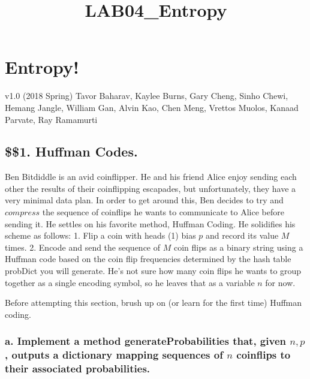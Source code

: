 \documentclass[11pt]{article}
\title{LAB04\_Entropy}
\begin{document}
    
    
    \maketitle
    
    

    
    \section{Entropy!}\label{entropy}

v1.0 (2018 Spring) Tavor Baharav, Kaylee Burns, Gary Cheng, Sinho Chewi,
Hemang Jangle, William Gan, Alvin Kao, Chen Meng, Vrettos Muolos, Kanaad
Parvate, Ray Ramamurti

    \subsection{\texorpdfstring{\$\$1. Huffman
Codes.}{\$\$1. Huffman Codes.}}\label{huffman-codes.}

    Ben Bitdiddle is an avid coinflipper. He and his friend Alice enjoy
sending each other the results of their coinflipping escapades, but
unfortunately, they have a very minimal data plan. In order to get
around this, Ben decides to try and \(\textit{compress}\) the sequence
of coinflips he wants to communicate to Alice before sending it. He
settles on his favorite method, Huffman Coding. He solidifies his scheme
as follows: 1. Flip a coin with heads (1) bias \(p\) and record its
value \(M\) times. 2. Encode and send the sequence of \(M\) coin flips
as a binary string using a Huffman code based on the coin flip
frequencies determined by the hash table probDict you will generate.
He's not sure how many coin flips he wants to group together as a single
encoding symbol, so he leaves that as a variable \(n\) for now.

Before attempting this section, brush up on (or learn for the first
time) Huffman coding.

    \subsubsection{\texorpdfstring{a. Implement a method
generateProbabilities that, given \(n,p\), outputs a dictionary mapping
sequences of \(n\) coinflips to their associated probabilities.
}{a. Implement a method generateProbabilities that, given n,p, outputs a dictionary mapping sequences of n coinflips to their associated probabilities. }}\label{a.-implement-a-method-generateprobabilities-that-given-np-outputs-a-dictionary-mapping-sequences-of-n-coinflips-to-their-associated-probabilities.}
\end{document}
